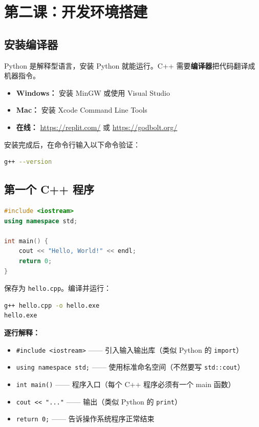 \documentclass[a4paper,12pt]{ctexart}
\begin{document}
\section*{第二课：开发环境搭建}

\subsection*{安装编译器}

Python 是解释型语言，安装 Python 就能运行。C++ 需要\textbf{编译器}把代码翻译成机器指令。

\begin{itemize}
  \item \textbf{Windows：} 安装 MinGW 或使用 Visual Studio
  \item \textbf{Mac：} 安装 Xcode Command Line Tools
  \item \textbf{在线：} \url{https://replit.com/} 或 \url{https://godbolt.org/}
\end{itemize}

安装完成后，在命令行输入以下命令验证：

\begin{lstlisting}[language=bash]
g++ --version
\end{lstlisting}

\subsection*{第一个 C++ 程序}

\begin{lstlisting}[language=C++]
#include <iostream>
using namespace std;

int main() {
    cout << "Hello, World!" << endl;
    return 0;
}
\end{lstlisting}

保存为 \texttt{hello.cpp}。编译并运行：

\begin{lstlisting}[language=bash]
g++ hello.cpp -o hello.exe
hello.exe
\end{lstlisting}

\textbf{逐行解释：}
\begin{itemize}
  \item \texttt{\#include <iostream>} —— 引入输入输出库（类似 Python 的 \texttt{import}）
  \item \texttt{using namespace std;} —— 使用标准命名空间（不然要写 \texttt{std::cout}）
  \item \texttt{int main()} —— 程序入口（每个 C++ 程序必须有一个 main 函数）
  \item \texttt{cout << "..."} —— 输出（类似 Python 的 \texttt{print}）
  \item \texttt{return 0;} —— 告诉操作系统程序正常结束
\end{itemize}
\end{document}
